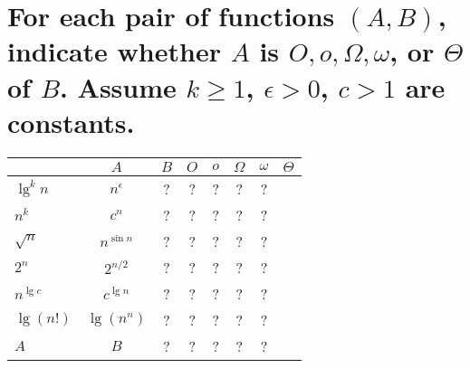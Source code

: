 \section[Problem 5]{For each pair of functions $(A, B)$, indicate whether $A$ is $O, o, \Omega, \omega$, or $\Theta$ of $B$. Assume $k \geq 1$, $\epsilon > 0$, $c > 1$ are constants.}
\begin{center}
	\begin{tabular}{lcc|c|c|c|c|c}
		& $A$ & $B$ & $O$ & $o$ & $\Omega$ & $\omega$ & $\Theta$ \\ \hline
		$\lg^k n$ & $n^{\epsilon}$ & ? & ? & ? & ? & ? \\ \hline
		$n^k$ & $c^n$ & ? & ? & ? & ? & ? \\ \hline
		$\sqrt{n}$ & $n^{\sin n}$ & ? & ? & ? & ? & ? \\ \hline
		$2^n$ & $2^{n/2}$ & ? & ? & ? & ? & ? \\ \hline
		$n^{\lg c}$ & $c^{\lg n}$ & ? & ? & ? & ? & ? \\ \hline
		$\lg(n!)$ & $\lg(n^n)$ & ? & ? & ? & ? & ? \\ \hline
		$A$ & $B$ & ? & ? & ? & ? & ?
	\end{tabular}
\end{center}


